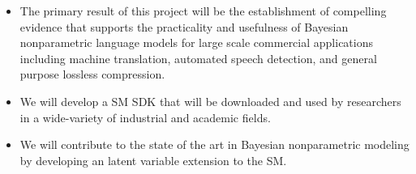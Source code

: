 \documentclass[10pt]{article}
\begin{document}
\begin{itemize}
\item The primary result of this project will be the establishment of compelling evidence that supports the practicality and usefulness of Bayesian nonparametric language models for large scale commercial applications including machine translation, automated speech detection, and general purpose lossless compression.
\item We will develop a SM SDK that will be downloaded and used by researchers in a wide-variety of industrial and academic fields.
\item We will contribute to the state of the art in Bayesian nonparametric modeling by developing an latent variable extension to the SM.
\end{itemize}

\vspace{.2cm}
\end{document}
